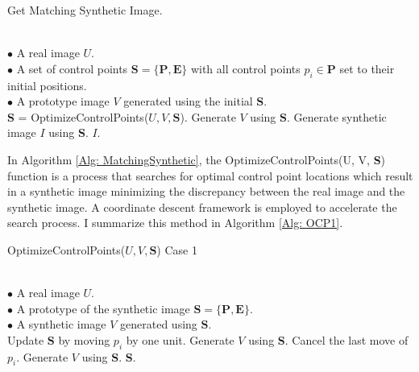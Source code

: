 \documentclass{iitthesis}
\begin{document}
{\linespread{1.5}
\begin{algorithm}[htb]  
\small
 	\caption{ Get Matching Synthetic Image.}   
	\label{Alg: MatchingSynthetic}    	
\begin{algorithmic}[1]  	\REQUIRE ~~\\ 		
$\bullet$ A real image $U$. \\ 	
	$\bullet$ A set of control points 
$\textbf{S}=\{\textbf{P}, \textbf{E}\}$ 
with all control points $p_i\in \textbf{P}$ set to their initial positions.\\ 	
	$\bullet$ A prototype image $V$ generated using the initial $\textbf{S}$.  \\ 	
		\STATE \textbf{S} = OptimizeControlPoints($U, V, \textbf{S}$). 		
	\STATE Generate $V$ using $\textbf{S}$. 		
\ENDWHILE 
		\STATE Generate synthetic image $I$ using \textbf{S}. 	
	\RETURN $I$. 	
\end{algorithmic} 
 \end{algorithm}  
}

In Algorithm \ref{Alg: MatchingSynthetic}, the OptimizeControlPoints(U, V, \textbf{S}) function is a process that searches for optimal control point locations which result in a synthetic image minimizing the discrepancy between the real image and the synthetic image. A coordinate descent framework is employed to accelerate the search process. I summarize this method in Algorithm \ref{Alg: OCP1}.

{\linespread{1.5}
\begin{algorithm}[htb]  
\small
 	\caption{ OptimizeControlPoints($U, V, \textbf{S}$) Case 1}   
	\label{Alg: OCP1}    
	\begin{algorithmic}[1]  		\REQUIRE ~~\\ 
		$\bullet$ A real image $U$. \\ 
		$\bullet$ A prototype of the synthetic image $\textbf{S}=\{\textbf{P}, \textbf{E}\}$.\\ 	
	$\bullet$ A synthetic image $V$ generated using $\textbf{S}$.  \\ 	
	 		\STATE Update $\textbf{S}$ by moving $p_i$ by one unit. 	
	\STATE Generate $V$ using \textbf{S}. 	
			\STATE Cancel the last move of $p_i$. 	
		\STATE Generate $V$ using \textbf{S}. 	
	\ENDIF 	
	\ENDFOR 	
	\RETURN \textbf{S}. 	
\end{algorithmic}   
\end{algorithm}  
}
\end{document}
